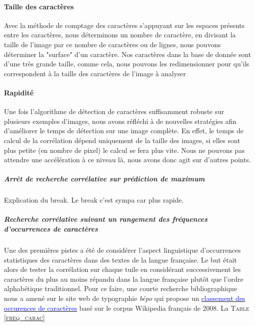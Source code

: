 \documentclass[a4paper,12pt,titlepage]{report}
\begin{document}
	\paragraph{Taille des caractères}
	Avec la méthode de comptage des caractères s'appuyant sur les espaces présents entre les caractères, nous déterminons un nombre de caractère, en divisant la taille de l'image par ce nombre de caractères ou de lignes, nous pouvons déterminer la "surface" d'un caractère. Nos caractères dans la base de donnée sont d'une très grande taille, comme cela, nous pouvons les redimensionner pour qu'ils correspondent à la taille des caractères de l'image à analyser
	\paragraph{Rapidité}
	Une fois l'algorithme de détection de caractères suffisamment robuste sur plusieurs exemples d'images, nous avons réfléchi à de nouvelles stratégies afin d'améliorer le temps de détection sur une image complète.
	En effet, le temps de calcul de la corrélation dépend uniquement de la taille des images, si elles sont plus petite (en nombre de pixel) le calcul se fera plus vite. Nous ne pouvons pas attendre une accélération à ce niveau là, nous avons donc agit sur d'autres points.
	\subparagraph{Arrêt de recherche corrélative sur prédiction de maximum}
	Explication du break. Le break c'est sympa car plus rapide.
	\subparagraph{Recherche corrélative suivant un rangement des fréquences d’occurrences de caractères}	 
	 Une des premières pistes a été de considérer l'aspect linguistique d’occurrences statistiques des caractères dans des textes de la langue française. Le but était alors de tester la corrélation sur chaque tuile en considérant successivement les caractères du plus au moins répandu dans la langue française plutôt que l'ordre alphabétique traditionnel. Pour ce faire, une courte recherche bibliographique nous a amené sur le site web de typographie \textit{bépo} qui propose un \href{http://bepo.fr/wiki/Fr%C3%A9quence_des_caract%C3%A8res}{\textcolor{blue}{classement des occurences de caractères}} basé sur le corpus Wikipedia français de 2008. La \textsc{Table \ref{freq_carac}} 
\end{document}
